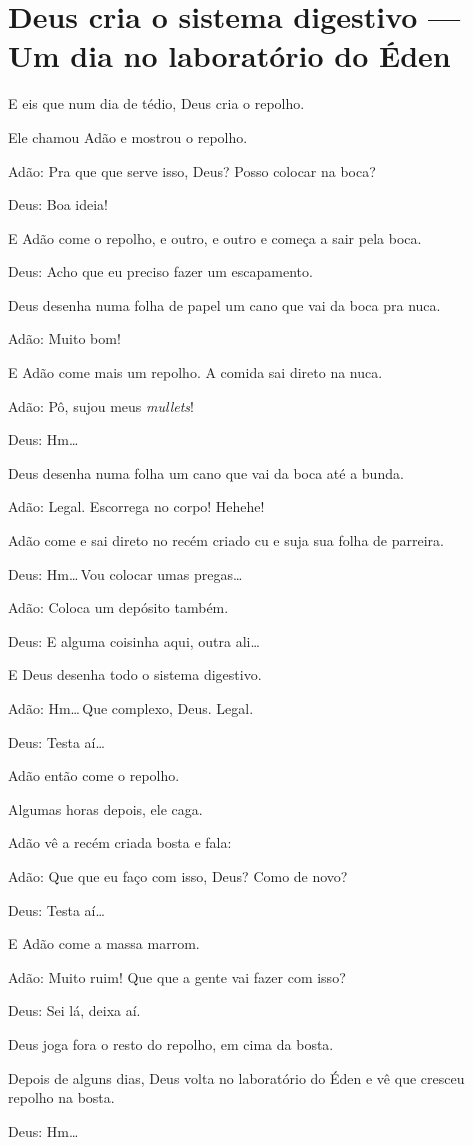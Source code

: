 \chapter[Deus cria o sistema digestivo]{Deus cria o sistema digestivo --- Um dia no laboratório do Éden}

E eis que num dia de tédio, Deus cria o repolho.

Ele chamou Adão e mostrou o repolho.

Adão: Pra que que serve isso, Deus? Posso colocar na boca?

\enlargethispage{\baselineskip}

Deus: Boa ideia!

E Adão come o repolho, e outro, e outro e começa a sair pela boca.

Deus: Acho que eu preciso fazer um escapamento.

Deus desenha numa folha de papel um cano que vai da boca pra nuca.

Adão: Muito bom!

E Adão come mais um repolho. A comida sai direto na nuca.

Adão: Pô, sujou meus \emph{mullets}!

Deus: Hm\ldots

Deus desenha numa folha um cano que vai da boca até a bunda.

Adão: Legal. Escorrega no corpo! Hehehe!

Adão come e sai direto no recém criado cu e suja sua folha de parreira.

Deus: Hm\ldots\,Vou colocar umas pregas\ldots

Adão: Coloca um depósito também.

Deus: E alguma coisinha aqui, outra ali\ldots

E Deus desenha todo o sistema digestivo.

Adão: Hm\ldots\,Que complexo, Deus. Legal.

Deus: Testa aí\ldots

Adão então come o repolho.

Algumas horas depois, ele caga.

Adão vê a recém criada bosta e fala:

Adão: Que que eu faço com isso, Deus? Como de novo?

Deus: Testa aí\ldots

E Adão come a massa marrom.

Adão: Muito ruim! Que que a gente vai fazer com isso? 

Deus: Sei lá, deixa aí.

\enlargethispage{\baselineskip}

Deus joga fora o resto do repolho, em cima da bosta.

Depois de alguns dias, Deus volta no laboratório do Éden e vê que cresceu repolho na bosta.

Deus: Hm\ldots
